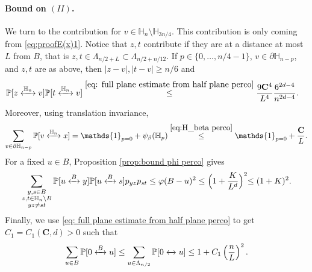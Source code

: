\documentclass[11pt,a4paper]{article}
\numberwithin{equation}{section}
\theoremstyle{plain}
\theoremstyle{definition}
\newcommand\bfC{\mathbf{C}}
\newcommand{\connect}{\xleftrightarrow}
\begin{document}
\paragraph{Bound on $(II)$.} We turn to the contribution for $v\in \mathbb H_n\setminus \mathbb H_{3n/4}$. This contribution is only coming from \eqref{eq:proofE(x)1}. Notice that $z,t$ contribute if they are at a distance at most $L$ from $B$, that is $z,t\in \Lambda_{n/2+L}\subset \Lambda_{n/2+n/12}$. If $p\in \{0,\ldots,n/4-1\}$, $v\in \partial \mathbb H_{n-p}$, and $z,t$ are as above, then $|z-v|,|t-v|\geq n/6$ and
\begin{align}\label{eq:appendixC1}
	\mathbb P[z\connect{\mathbb H_n\:}v]\mathbb P[t\connect{\mathbb H_n\:}v]&\stackrel{\eqref{eq: full plane estimate from half plane perco}}\leq \frac{9\bfC^4}{L^4}\frac{6^{2d-4}}{n^{2d-4}}.
\end{align}
Moreover, using translation invariance,
\begin{equation}\label{eq:appendixC2}
	\sum_{v\in \partial\mathbb H_{n-p}}\mathbb P[v\connect{\mathbb H_n\:}x]= {\mathds{1}_{p=0}}+\psi_\beta(\mathbb H_{p})\stackrel{\eqref{eq:H_beta perco}}\leq {\mathds{1}_{p=0}}+\frac{\bfC}{L}.
\end{equation}
For a fixed $u\in B$, Proposition \ref{prop:bound phi perco} gives
\begin{equation}\label{eq:appendixC3}
	\sum_{\substack{y, s\in B\\ z,t\in \mathbb H_n \setminus B\\ yz\neq st}}\mathbb P[u \connect{B\:}y]\mathbb P[u\connect{B\:}s]p_{yz}p_{st}\leq \varphi(B-u)^2\leq \Big( 1+\frac{K}{L^d}\Big)^2{\leq (1+K)^2}.
\end{equation}
Finally, we use \eqref{eq: full plane estimate from half plane perco} to get $C_1=C_1(\bfC,d)>0$ such that
\begin{equation}\label{eq:appendixC4}
	\sum_{u\in B}\mathbb P[0\connect{B\:}u] 
	\leq
	\sum_{u\in \Lambda_{n/2}}\mathbb P[0\connect{}u]
	\leq 1+C_1\left(\frac{n}{L}\right)^2.
\end{equation}
\end{document}
